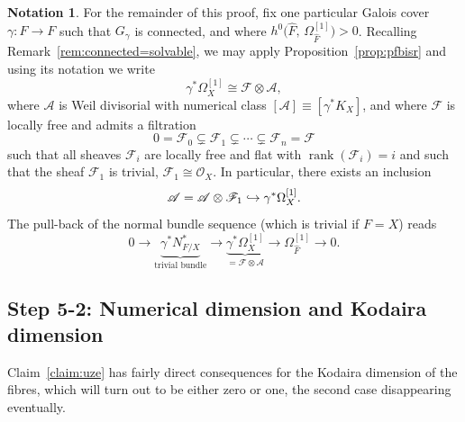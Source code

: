 \documentclass[JEP,XML,SOM,Unicode,published]{cedram}
\let\scr\mathscr
\newcommand\hto{\mathrel{\lhook\joinrel\to}}
\theoremstyle{plain}
\theoremstyle{definition}
\newtheorem{notation}[thm]{Notation}
\numberwithin{equation}{thm}
\numberwithin{enumi}{thm}
\DeclareMathOperator{\rank}{rank}
\newcommand{\sA}{\scr{A}}
\newcommand{\sF}{\scr{F}}
\newcommand{\sO}{\scr{O}}
\let\what\widehat
\begin{document}
\begin{notation}\label{not:50-20}
For the remainder of this proof, fix one particular Galois cover
\hbox{$\gamma : \what{F} \to F$} such that $G_\gamma$ is connected, and where
$h^0 \bigl(\what{F},\, \Omega^{[1]}_{\what{F}}\bigr) > 0$. Recalling
Remark~\ref{rem:connected=solvable}, we may apply
Proposition~\ref{prop:pfbisr} and using its notation we write
\begin{equation}\label{eq:OmegaFA0-1a}
\gamma^* \Omega^{[1]}_X \cong \sF \otimes \sA,
\end{equation}
where $\sA$ is Weil divisorial with numerical class $[\sA] \equiv [\gamma^* K_X]$, and
where $\sF$ is locally free and admits a filtration
\begin{equation}\label{eq:5-20-2}
0 = \sF_0 \subsetneq \sF_1 \subsetneq \cdots \subsetneq \sF_n = \sF
\end{equation}
such that all sheaves $\sF_i$ are locally free and flat with $\rank (\sF_i)= i$
and such that the sheaf $\sF_1$ is trivial, $\sF_1 \cong \sO_X$. In particular, there
exists an inclusion
\begin{equation}\label{eq:gjfgjh}
\sA = \sA \otimes \sF_1 \hto \gamma^* \Omega^{[1]}_X.
\end{equation}
The pull-back of the normal bundle sequence (which is trivial if $F=X$) reads
\begin{equation}\label{eq:iopz}
0 \to \underbrace{\gamma^* N^*_{F/X}}_{\text{trivial bundle}} \to
\underbrace{\gamma^* \Omega^{[1]}_X}_{= \sF \otimes \sA} \to \Omega^{[1]}_{\what{F}} \to 0.
\end{equation}
\end{notation}

\subsection*{Step 5-2: Numerical dimension and Kodaira dimension}

Claim~\ref{claim:uze} has fairly direct consequences for the Kodaira dimension
of the fibres, which will turn out to be either zero or one, the second case
disappearing eventually.
\end{document}
